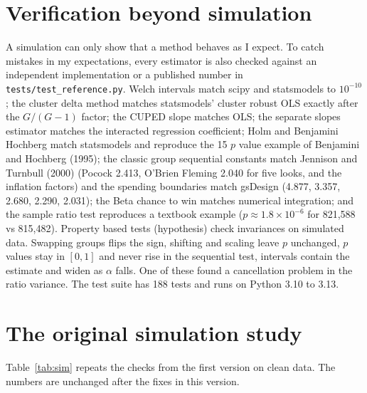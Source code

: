 \documentclass[10pt]{article}
\begin{document}
\section{Verification beyond simulation}
A simulation can only show that a method behaves as I expect. To catch mistakes in my expectations, every estimator is also checked against an independent implementation or a published number in \texttt{tests/\allowbreak test\_reference.py}. Welch intervals match scipy and statsmodels to $10^{-10}$; the cluster delta method matches statsmodels' cluster robust OLS exactly after the $G/(G-1)$ factor; the CUPED slope matches OLS; the separate slopes estimator matches the interacted regression coefficient; Holm and Benjamini Hochberg match statsmodels and reproduce the 15 $p$ value example of Benjamini and Hochberg (1995); the classic group sequential constants match Jennison and Turnbull (2000) (Pocock 2.413, O'Brien Fleming 2.040 for five looks, and the inflation factors) and the spending boundaries match gsDesign (4.877, 3.357, 2.680, 2.290, 2.031); the Beta chance to win matches numerical integration; and the sample ratio test reproduces a textbook example ($p \approx 1.8\times 10^{-6}$ for 821,588 vs 815,482). Property based tests (hypothesis) check invariances on simulated data. Swapping groups flips the sign, shifting and scaling leave $p$ unchanged, $p$ values stay in $[0, 1]$ and never rise in the sequential test, intervals contain the estimate and widen as $\alpha$ falls. One of these found a cancellation problem in the ratio variance. The test suite has 188 tests and runs on Python 3.10 to 3.13.

\section{The original simulation study}
Table~\ref{tab:sim} repeats the checks from the first version on clean data. The numbers are unchanged after the fixes in this version.
\end{document}
